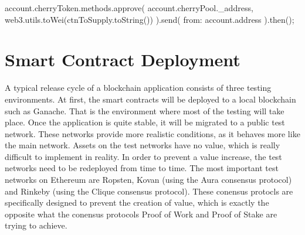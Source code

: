 \begin{GenericCode}
account.cherryToken.methods.approve(
  account.cherryPool._address,
  web3.utils.toWei(ctnToSupply.toString())
).send({ from: account.address }).then();	
\end{GenericCode}


\section{Smart Contract Deployment}
\label{sec:deployment}

A typical release cycle of a blockchain application consists of three testing environments. At first, the smart contracts will be deployed to a local blockchain such as Ganache\cite{Ganache}. That is the environment where most of the testing will take place. Once the application is quite stable, it will be migrated to a public test network. These networks provide more realistic conditions, as it behaves more like the main network. Assets on the test networks have no value, which is really difficult to implement in reality. In order to prevent a value increase, the test networks need to be redeployed from time to time.
The most important test networks on Ethereum are Ropsten, Kovan (using the Aura consensus protocol) and Rinkeby (using the Clique consensus protocol). These conensus protocls are specifically designed to prevent the creation of value, which is exactly the opposite what the conensus protocols Proof of Work and Proof of Stake are trying to achieve.





